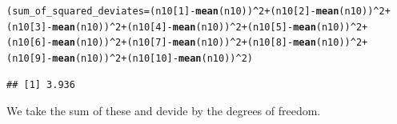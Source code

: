 \documentclass{tufte-handout}\usepackage[]{graphicx}\usepackage[]{color}
\makeatletter
\newcommand{\hlnum}[1]{\textcolor[rgb]{0.686,0.059,0.569}{#1}}%
\newcommand{\hlopt}[1]{\textcolor[rgb]{0,0,0}{#1}}%
\newcommand{\hlstd}[1]{\textcolor[rgb]{0.345,0.345,0.345}{#1}}%
\newcommand{\hlkwb}[1]{\textcolor[rgb]{0.69,0.353,0.396}{#1}}%
\newcommand{\hlkwd}[1]{\textcolor[rgb]{0.737,0.353,0.396}{\textbf{#1}}}%
\newenvironment{kframe}{%
 \def\at@end@of@kframe{}%
 \ifinner\ifhmode%
  \def\at@end@of@kframe{\end{minipage}}%
  \begin{minipage}{\columnwidth}%
 \fi\fi%
 \def\FrameCommand##1{\hskip\@totalleftmargin \hskip-\fboxsep
 \colorbox{shadecolor}{##1}\hskip-\fboxsep
     \hskip-\linewidth \hskip-\@totalleftmargin \hskip\columnwidth}%
 \MakeFramed {\advance\hsize-\width
   \@totalleftmargin\z@ \linewidth\hsize
   \@setminipage}}%
 {\par\unskip\endMakeFramed%
 \at@end@of@kframe}
\newenvironment{knitrout}{}{} %
\makeatother
\begin{document}
\begin{knitrout}
\color{fgcolor}\begin{kframe}
\begin{alltt}
\hlstd{(sum_of_squared_deviates} \hlkwb{=} \hlstd{(n10[}\hlnum{1}\hlstd{]} \hlopt{-} \hlkwd{mean}\hlstd{(n10))}\hlopt{^}\hlnum{2} \hlopt{+} \hlstd{(n10[}\hlnum{2}\hlstd{]} \hlopt{-} \hlkwd{mean}\hlstd{(n10))}\hlopt{^}\hlnum{2} \hlopt{+} \hlstd{(n10[}\hlnum{3}\hlstd{]} \hlopt{-} \hlkwd{mean}\hlstd{(n10))}\hlopt{^}\hlnum{2} \hlopt{+} \hlstd{(n10[}\hlnum{4}\hlstd{]} \hlopt{-} \hlkwd{mean}\hlstd{(n10))}\hlopt{^}\hlnum{2} \hlopt{+} \hlstd{(n10[}\hlnum{5}\hlstd{]} \hlopt{-} \hlkwd{mean}\hlstd{(n10))}\hlopt{^}\hlnum{2} \hlopt{+}
\hlstd{(n10[}\hlnum{6}\hlstd{]} \hlopt{-} \hlkwd{mean}\hlstd{(n10))}\hlopt{^}\hlnum{2} \hlopt{+} \hlstd{(n10[}\hlnum{7}\hlstd{]} \hlopt{-} \hlkwd{mean}\hlstd{(n10))}\hlopt{^}\hlnum{2} \hlopt{+} \hlstd{(n10[}\hlnum{8}\hlstd{]} \hlopt{-} \hlkwd{mean}\hlstd{(n10))}\hlopt{^}\hlnum{2} \hlopt{+} \hlstd{(n10[}\hlnum{9}\hlstd{]} \hlopt{-} \hlkwd{mean}\hlstd{(n10))}\hlopt{^}\hlnum{2} \hlopt{+} \hlstd{(n10[}\hlnum{10}\hlstd{]} \hlopt{-} \hlkwd{mean}\hlstd{(n10))}\hlopt{^}\hlnum{2}\hlstd{)}
\end{alltt}
\begin{verbatim}
## [1] 3.936
\end{verbatim}
\end{kframe}
\end{knitrout}

We take the sum of these and devide by the degrees of freedom.
\end{document}
